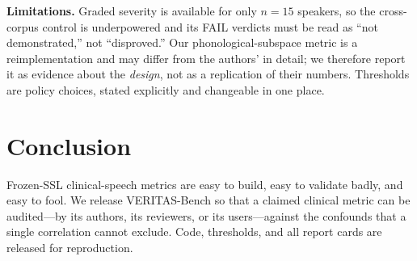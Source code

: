 \documentclass[conference]{IEEEtran}
\begin{document}
\textbf{Limitations.} Graded severity is available for only $n{=}15$ speakers, so the
cross-corpus control is underpowered and its FAIL verdicts must be read as ``not
demonstrated,'' not ``disproved.'' Our phonological-subspace metric is a
reimplementation and may differ from the authors' in detail; we therefore report it
as evidence about the \emph{design}, not as a replication of their numbers. Thresholds
are policy choices, stated explicitly and changeable in one place.

\section{Conclusion}
Frozen-SSL clinical-speech metrics are easy to build, easy to validate badly, and
easy to fool. We release VERITAS-Bench so that a claimed clinical metric can be
audited---by its authors, its reviewers, or its users---against the confounds that a
single correlation cannot exclude. Code, thresholds, and all report cards are
released for reproduction.



\end{document}
